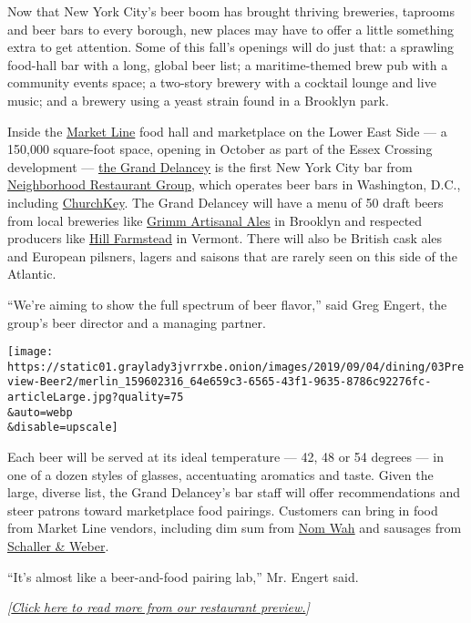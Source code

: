 Now that New York City's beer boom has brought thriving breweries,
taprooms and beer bars to every borough, new places may have to offer a
little something extra to get attention. Some of this fall's openings
will do just that: a sprawling food-hall bar with a long, global beer
list; a maritime-themed brew pub with a community events space; a
two-story brewery with a cocktail lounge and live music; and a brewery
using a yeast strain found in a Brooklyn park.

Inside the \href{https://marketline.nyc/}{Market Line} food hall and
marketplace on the Lower East Side --- a 150,000 square-foot space,
opening in October as part of the Essex Crossing development ---
\href{https://thegranddelancey.com/}{the Grand Delancey} is the first
New York City bar from
\href{https://neighborhoodrestaurantgroup.com/}{Neighborhood Restaurant
Group}, which operates beer bars in Washington, D.C., including
\href{https://churchkeydc.com/}{ChurchKey}. The Grand Delancey will have
a menu of 50 draft beers from local breweries like
\href{https://grimmales.com/}{Grimm Artisanal Ales} in Brooklyn and
respected producers like \href{https://hillfarmstead.com/}{Hill
Farmstead} in Vermont. There will also be British cask ales and European
pilsners, lagers and saisons that are rarely seen on this side of the
Atlantic.

``We're aiming to show the full spectrum of beer flavor,'' said Greg
Engert, the group's beer director and a managing partner.

\texttt{[image: https://static01.graylady3jvrrxbe.onion/images/2019/09/04/dining/03Preview-Beer2/merlin\_159602316\_64e659c3-6565-43f1-9635-8786c92276fc-articleLarge.jpg?quality=75\\\&auto=webp\\\&disable=upscale]}

Each beer will be served at its ideal temperature --- 42, 48 or 54
degrees --- in one of a dozen styles of glasses, accentuating aromatics
and taste. Given the large, diverse list, the Grand Delancey's bar staff
will offer recommendations and steer patrons toward marketplace food
pairings. Customers can bring in food from Market Line vendors,
including dim sum from \href{https://nomwah.com/}{Nom Wah} and sausages
from \href{https://schallerweber.com/}{Schaller \& Weber}.

``It's almost like a beer-and-food pairing lab,'' Mr. Engert said.

\emph{{[}}\href{https://www.nytimes3xbfgragh.onion/2019/09/03/dining/fall-restaurant-preview-nyc.html}{\emph{Click
here to read more from our restaurant preview.}}\emph{{]}}

